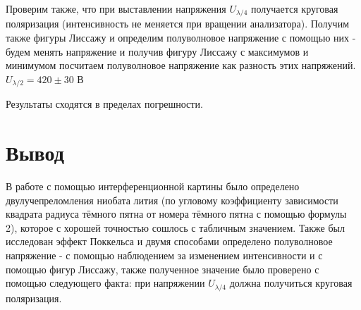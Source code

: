 \documentclass[a4paper,12pt]{article} %
\begin{document}
Проверим также, что при выставлении напряжения $U_{\lambda/4}$ получается круговая поляризация (интенсивность не меняется при вращении анализатора). Получим также фигуры Лиссажу и определим полуволновое напряжение с помощью них - будем менять напряжение и получив фигуру Лиссажу с максимумов и минимумом посчитаем полуволновое напряжение как разность этих напряжений.
$U_{\lambda/2} = 420 \pm 30$ В

Результаты сходятся в пределах погрешности.

\section{Вывод}
В работе с помощью интерференционной картины было определено двулучепреломления ниобата лития (по угловому коэффициенту зависимости квадрата радиуса тёмного пятна от номера тёмного пятна с помощью формулы 2), которое с хорошей точностью сошлось с табличным значением.
Также был исследован эффект Поккельса и двумя способами определено полуволновое напряжение - с помощью наблюдением за изменением интенсивности и с помощью фигур Лиссажу, также полученное значение было проверено с помощью следующего факта: при напряжении $U_{\lambda/4}$ должна получиться круговая поляризация. 
\end{document}
